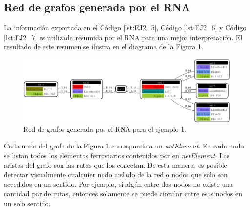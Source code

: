 \subsection{Red de grafos generada por el RNA}

	 La información exportada en el Código \ref{lst:EJ2_5}, Código \ref{lst:EJ2_6} y Código \ref{lst:EJ2_7} es utilizada resumida por el RNA para una mejor interpretación. El resultado de este resumen se ilustra en el diagrama de la Figura \ref{fig:EJ2_8}.
	
	\begin{figure}[H]
		\centering
		\includegraphics[width=1\textwidth]{Figuras/Graph_2}
		\centering\caption{Red de grafos generada por el RNA para el ejemplo 1.}
		\label{fig:EJ2_8}
	\end{figure}
	
	Cada nodo del grafo de la Figura \ref{fig:EJ2_8} corresponde a un \textit{netElement}. En cada nodo se listan todos los elementos ferroviarios contenidos por en \textit{netElement}. Las aristas del grafo son las rutas que los conectan. De esta manera, es posible detectar visualmente cualquier nodo aislado de la red o nodos que solo son accedidos en un sentido. Por ejemplo, si algún entre dos nodos no existe una cantidad par de rutas, entonces solamente se puede circular entre esos nodos en un solo sentido.